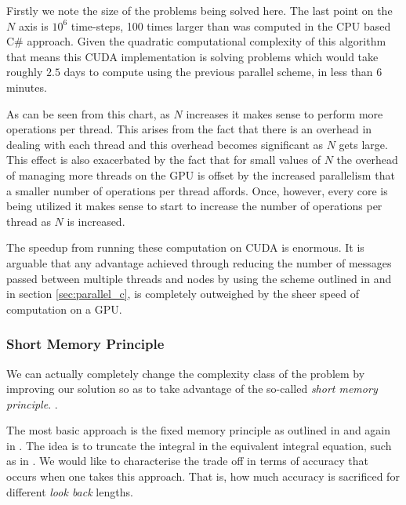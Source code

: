 Firstly we note the size of the problems being solved here. The last point on the $ N $ axis is $10^6$ time-steps, 100 times larger than was computed in the CPU based C\# approach. Given the quadratic computational complexity of this algorithm that means this CUDA implementation is solving problems which would take roughly $ 2.5 $ days to compute using the previous parallel scheme, in less than 6 minutes.

As can be seen from this chart, as $ N $ increases it makes sense to perform more operations per thread. This arises from the fact that there is an overhead in dealing with each thread and this overhead becomes significant as $ N $ gets large. This effect is also exacerbated by the fact that for small values of $ N $ the overhead of managing more threads on the GPU is offset by the increased parallelism that a smaller number of operations per thread affords. Once, however, every core is being utilized it makes sense to start to increase the number of operations per thread as $ N $ is increased.

The speedup from running these computation on CUDA is enormous. It is arguable that any advantage achieved through reducing the number of messages passed between multiple threads and nodes by using the scheme outlined in \cite{Diethelm2011} and in section \ref{sec:parallel_c}, is completely outweighed by the sheer speed of computation on a GPU. 

\subsubsection{Short Memory Principle}
\label{subsubsec:reduce_complexity}

We can actually completely change the complexity class of the problem by improving our solution so as to take advantage of the so-called \emph{short memory principle}.  \cite{Podlubny1999, Ford2001}.

The most basic approach is the fixed memory principle as outlined in \cite{Podlubny1999} and again in \cite{Ford2001}. The idea is to truncate the integral in the equivalent integral equation, such as in \label{eq:num_int_eq}. We would like to characterise the trade off in terms of accuracy that occurs when one takes this approach. That is, how much accuracy is sacrificed for different \emph{look back} lengths.

